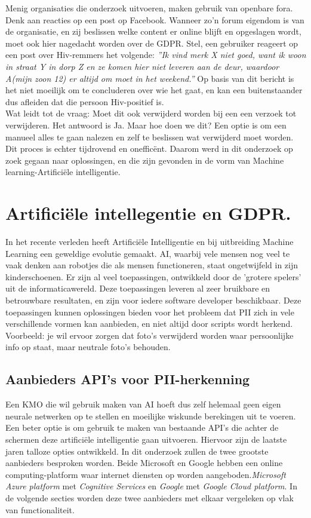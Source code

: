 Menig organisaties die onderzoek uitvoeren, maken gebruik van openbare fora. Denk aan reacties op een post op Facebook. Wanneer zo'n forum eigendom is van de organisatie, en zij beslissen welke content er online blijft en opgeslagen wordt, moet ook hier nagedacht worden over de GDPR. Stel, een gebruiker reageert op een post over Hiv-remmers het volgende: \textit{”Ik vind merk X niet goed, want ik woon in straat Y in dorp Z en ze komen hier niet leveren aan de deur, waardoor A(mijn zoon 12) er altijd om moet in het weekend.”}
Op basis van dit bericht is het niet moeilijk om te concluderen over wie het gaat, en kan een buitenstaander dus afleiden dat die persoon Hiv-positief is. \\ Wat leidt tot de vraag: Moet dit ook verwijderd worden bij een een verzoek tot verwijderen. Het antwoord is Ja. Maar hoe doen we dit? Een optie is om een manueel alles te gaan nalezen en zelf te beslissen wat verwijderd moet worden. Dit proces is echter tijdrovend en onefficënt. Daarom werd in dit onderzoek op zoek gegaan naar oplossingen, en die zijn gevonden in de vorm van Machine learning-Artificiële intelligentie. 

\section{Artificiële intellegentie en GDPR.}
In het recente verleden heeft Artificiële Intelligentie en bij uitbreiding Machine Learning een geweldige evolutie gemaakt. AI, waarbij vele mensen nog veel te vaak denken aan robotjes die als mensen functioneren, staat ongetwijfeld in zijn kinderschoenen. Er zijn al veel toepassingen, ontwikkeld door de 'grotere spelers' uit de informaticawereld. Deze toepassingen leveren al zeer bruikbare en betrouwbare resultaten, en zijn voor iedere software developer beschikbaar. Deze toepassingen kunnen oplossingen bieden voor het probleem dat PII zich in vele verschillende vormen kan aanbieden, en niet altijd door scripts wordt herkend.  Voorbeeld: je wil ervoor zorgen dat foto's verwijderd worden waar persoonlijke info op staat, maar neutrale foto's behouden.

\subsection{Aanbieders API's voor PII-herkenning}
Een KMO die wil gebruik maken van AI hoeft dus zelf helemaal geen eigen neurale netwerken op te stellen en moeilijke wiskunde berekingen uit te voeren. Een beter optie is om gebruik te maken van bestaande API's die achter de schermen deze artificiële intelligentie gaan uitvoeren. Hiervoor zijn de laatste jaren talloze opties ontwikkeld. In dit onderzoek zullen de twee grootste aanbieders besproken worden. Beide Microsoft en Google hebben een online computing-platform waar internet diensten op worden aangeboden.\textit{Microsoft Azure platform} met \textit{Cognitive Services} en  \textit{Google} met \textit{Google Cloud platform}. In de volgende secties worden deze twee aanbieders met elkaar vergeleken op vlak van functionaliteit.

